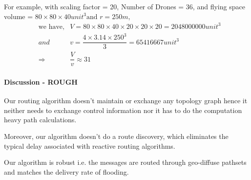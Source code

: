 For example, with scaling factor = 20, Number of Drones = 36, and flying space volume = $ 80 \times 80 \times 40 unit^3  \text{and } r = 250 m $,
\begin{eqnarray*}
& \text{we have,} & V = 80 \times 80 \times 40 \times 20 \times 20 \times 20 = 2048000000 unit^3 \\
& {and} & v = \dfrac{4 \times 3.14 \times 250 ^ 3}{3} = 65416667 unit ^ 3 \\
& \Rightarrow & \dfrac{V}{v} \approx 31
\end{eqnarray*}

\paragraph{Discussion - ROUGH}

Our routing algorithm doesn't maintain or exchange any topology graph hence it neither needs to exchange control information nor it has to do the computation heavy path calculations.

Moreover, our algorithm doesn't do a route discovery, which eliminates the typical delay associated with reactive routing algorithms. 

Our algorithm is robust i.e. the messages are routed through geo-diffuse pathsets and matches the delivery rate of flooding.